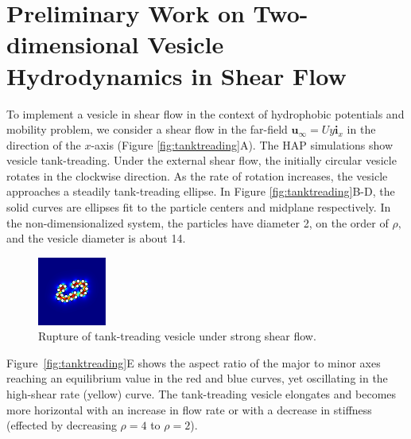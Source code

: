 \section{Preliminary Work on Two-dimensional Vesicle Hydrodynamics in Shear Flow} 
%
To implement a vesicle in shear flow in the context of hydrophobic potentials and mobility problem, 
we consider a shear flow in the far-field $\mathbf{u}_{\infty} = Uy\mathbf{i}_x$ in the direction of the $x$-axis
(Figure \ref{fig:tanktreading}A).
%
%
The HAP simulations show vesicle tank-treading. Under the external shear flow, the initially circular 
vesicle rotates in the clockwise direction. As the rate of rotation increases, the vesicle approaches
a steadily tank-treading ellipse. In Figure \ref{fig:tanktreading}B-D, the solid curves are ellipses fit to the particle centers
and midplane respectively. In the non-dimensionalized system, the particles have diameter 2, on the order of $\rho,$ 
and the vesicle diameter is about 14. 
%
\begin{figure}
\centerline{\includegraphics[width=0.2\textwidth]{figures/PW_fig5.pdf}}
\caption{\label{fig:rupture} Rupture of tank-treading vesicle under strong shear flow.}
\end{figure}
%
Figure~\ref{fig:tanktreading}E shows the aspect ratio of the major to minor axes reaching an equilibrium value in the 
red and blue curves, yet oscillating in the high-shear rate (yellow) curve.
The tank-treading vesicle elongates and becomes more horizontal 
with an increase in flow rate or 
with a decrease in stiffness (effected by decreasing $\rho = 4$ to $\rho = 2$). 


